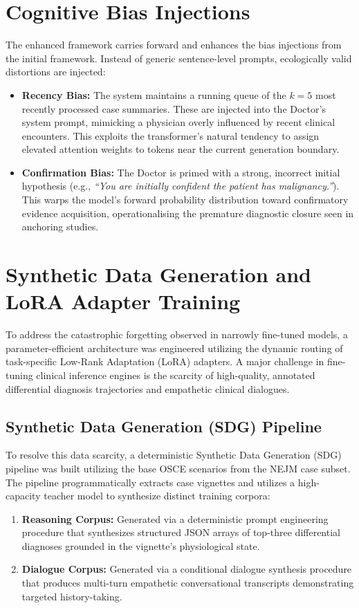 \section{Cognitive Bias Injections}

The enhanced framework carries forward and enhances the bias injections from the initial framework. Instead of generic sentence-level prompts, ecologically valid distortions are injected:

\begin{itemize}
    \item \textbf{Recency Bias:} The system maintains a running queue of the $k=5$ most recently processed case summaries. These are injected into the Doctor's system prompt, mimicking a physician overly influenced by recent clinical encounters. This exploits the transformer's natural tendency to assign elevated attention weights to tokens near the current generation boundary.
    \item \textbf{Confirmation Bias:} The Doctor is primed with a strong, incorrect initial hypothesis (e.g., \textit{``You are initially confident the patient has malignancy.''}). This warps the model's forward probability distribution toward confirmatory evidence acquisition, operationalising the premature diagnostic closure seen in anchoring studies.
\end{itemize}

\section{Synthetic Data Generation and LoRA Adapter Training}

To address the catastrophic forgetting observed in narrowly fine-tuned models, a parameter-efficient architecture was engineered utilizing the dynamic routing of task-specific Low-Rank Adaptation (LoRA) adapters. A major challenge in fine-tuning clinical inference engines is the scarcity of high-quality, annotated differential diagnosis trajectories and empathetic clinical dialogues.

\subsection{Synthetic Data Generation (SDG) Pipeline}
To resolve this data scarcity, a deterministic Synthetic Data Generation (SDG) pipeline was built utilizing the base OSCE scenarios from the NEJM case subset. The pipeline programmatically extracts case vignettes and utilizes a high-capacity teacher model to synthesize distinct training corpora:
\begin{enumerate}
    \item \textbf{Reasoning Corpus:} Generated via a deterministic prompt engineering procedure that synthesizes structured JSON arrays of top-three differential diagnoses grounded in the vignette's physiological state.
    \item \textbf{Dialogue Corpus:} Generated via a conditional dialogue synthesis procedure that produces multi-turn empathetic conversational transcripts demonstrating targeted history-taking.
\end{enumerate}

